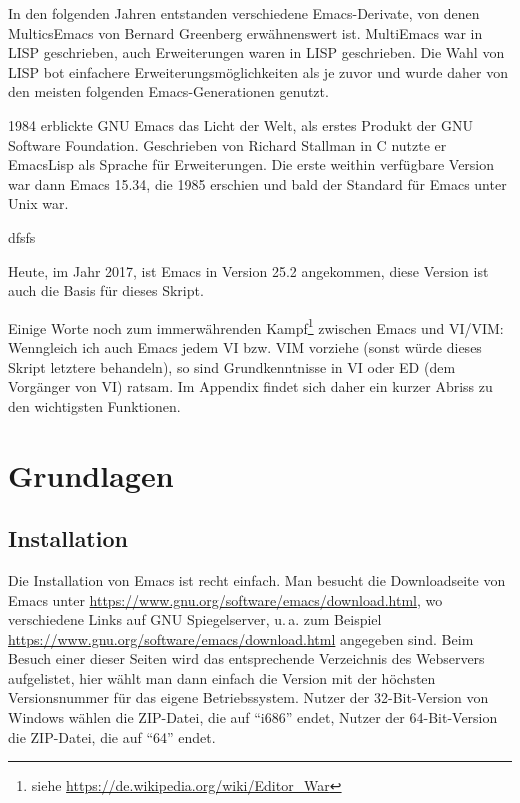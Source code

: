 \documentclass[12pt,ngerman]{scrbook}
\begin{document}
In den folgenden Jahren entstanden verschiedene Emacs-Derivate, von denen MulticsEmacs von Bernard Greenberg erwähnenswert ist. MultiEmacs war in LISP geschrieben, auch Erweiterungen waren in LISP geschrieben. Die Wahl von LISP bot einfachere Erweiterungsmöglichkeiten als je zuvor und wurde daher von den meisten folgenden Emacs-Generationen genutzt. 

1984 erblickte GNU Emacs das Licht der Welt, als erstes Produkt der GNU Software Foundation. Geschrieben von Richard Stallman in C nutzte er EmacsLisp als Sprache für Erweiterungen. Die erste weithin verfügbare Version war dann Emacs 15.34, die 1985 erschien und bald der Standard für Emacs unter Unix war.

\begin{tcolorbox}[title={Wissen: Richard Stallman und die GNU Foundation},arc=0pt]
dfsfs

\end{tcolorbox}


Heute, im Jahr 2017, ist Emacs in Version 25.2 angekommen, diese Version ist auch die Basis für dieses Skript.

Einige Worte noch zum immerwährenden Kampf\footnote{siehe \url{https://de.wikipedia.org/wiki/Editor_War}} zwischen Emacs und VI/VIM: Wenngleich ich auch Emacs jedem VI bzw. VIM vorziehe (sonst würde dieses Skript letztere behandeln), so sind Grundkenntnisse in VI oder ED (dem Vorgänger von VI) ratsam. Im Appendix findet sich daher ein kurzer Abriss zu den wichtigsten Funktionen.

\chapter{Grundlagen}

\section{Installation}

Die Installation von Emacs ist recht einfach. Man besucht die Downloadseite von Emacs unter \url{https://www.gnu.org/software/emacs/download.html}, wo verschiedene Links auf GNU Spiegelserver, u.\,a. zum Beispiel \url{https://www.gnu.org/software/emacs/download.html} angegeben sind. Beim Besuch einer dieser Seiten wird das entsprechende Verzeichnis des Webservers aufgelistet, hier wählt man dann einfach die Version mit der höchsten Versionsnummer für das eigene Betriebssystem. Nutzer der 32-Bit-Version von Windows wählen die ZIP-Datei, die auf \enquote{i686} endet, Nutzer der 64-Bit-Version die ZIP-Datei, die auf \enquote{64} endet.
\end{document}
